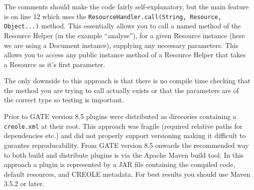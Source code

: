 The comments should make the code fairly self-explanatory, but the main feature
is on line 12 which uses the \lstinline!ResourceHandler.call(String, Resource, Object...)!
method. This essentially allows you to call a named method of the Resource Helper
(in the example ``analyse''), for a given Resource instance (here we are using a
Document instance), supplying any necessary parameters. This allows you to
access any public instance method of a Resource Helper that takes a Resource as
it's first parameter.

The only downside to this approach is that there is no compile time checking
that the method you are trying to call actually exists or that the parameters
are of the correct type so testing is important.


Prior to GATE version 8.5 plugins were distributed as direcories containing
a \verb!creole.xml! at their root. This approach was fragile (required relative
paths for dependencies etc.) and did not properly support versioning making it
difficult to gurantee reproducability. From GATE version 8.5 onwards the recommended
way to both build and distribute plugins is via the Apache Maven build tool.
In this approach a plugin is represented by a JAR file containing the compiled code,
default resources, and CREOLE metadata.  For best results you should use
Maven 3.5.2 or later.

